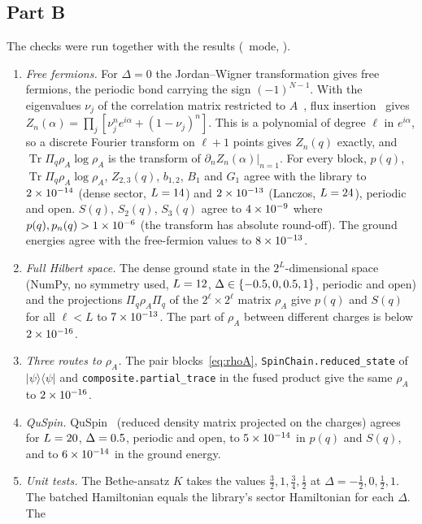 \documentclass[11pt]{article}
\DeclareMathOperator{\Tr}{Tr}
\newcommand{\code}[1]{\nolinkurl{#1}}
\begin{document}
\subsection{Part B}

The checks were run together with the results (\SRMode\ mode, \SRDevice).
\begin{enumerate}\itemsep1pt
\item[(B1)] \emph{Free fermions.} For $\Delta=0$ the Jordan--Wigner transformation gives free fermions, the periodic bond
carrying the sign $(-1)^{N-1}$. With the eigenvalues $\nu_j$ of the correlation matrix restricted to
$A$~\cite{peschel2003}, flux insertion~\cite{goldstein2018} gives $Z_n(\alpha)=\prod_j[\nu_j^ne^{i\alpha}+(1-\nu_j)^n]$.
This is a polynomial of degree $\ell$ in $e^{i\alpha}$, so a discrete Fourier transform on $\ell+1$ points gives $Z_n(q)$
exactly, and $\Tr\Pi_q\rho_A\log\rho_A$ is the transform of $\partial_nZ_n(\alpha)|_{n=1}$. For every block, $p(q)$,
$\Tr\Pi_q\rho_A\log\rho_A$, $Z_{2,3}(q)$, $b_{1,2}$, $B_1$ and $G_1$ agree with the library to $2\times10^{-14}$ (dense
sector, $L=14$) and $2\times10^{-13}$ (Lanczos, $L=24$), periodic and open. $S(q)$, $S_2(q)$, $S_3(q)$ agree
to $4\times10^{-9}$ where $p(q),p_n(q)>1\times10^{-6}$ (the transform has absolute round-off). The ground energies agree with the
free-fermion values to $8\times10^{-13}$.
\item[(B2)] \emph{Full Hilbert space.} The dense ground state in the $2^L$-dimensional space (NumPy, no symmetry used,
$L=12$, $\Delta\in\{-0.5, 0, 0.5, 1\}$, periodic and open) and the projections $\Pi_q\rho_A\Pi_q$ of the
$2^\ell\times2^\ell$ matrix $\rho_A$ give $p(q)$ and $S(q)$ for all $\ell<L$ to $7\times10^{-13}$. The part of $\rho_A$ between
different charges is below $2\times10^{-16}$.
\item[(B3)] \emph{Three routes to $\rho_A$.} The pair blocks~\eqref{eq:rhoA}, \code{SpinChain.reduced_state} of
$|\psi\rangle\langle\psi|$ and \code{composite.partial_trace} in the fused product give the same $\rho_A$ to
$2\times10^{-16}$.
\item[(B4)] \emph{QuSpin.} QuSpin~\cite{weinberg2017} (reduced density matrix projected on the charges) agrees for
$L=20$, $\Delta=0.5$, periodic and open, to $5\times10^{-14}$ in $p(q)$ and $S(q)$, and to $6\times10^{-14}$ in
the ground energy.
\item[(B5)] \emph{Unit tests.} The Bethe-ansatz $K$ takes the values $\frac32,1,\frac34,\frac12$ at
$\Delta=-\frac12,0,\frac12,1$. The batched Hamiltonian equals the library's sector Hamiltonian for each $\Delta$. The

\end{enumerate}
\end{document}
